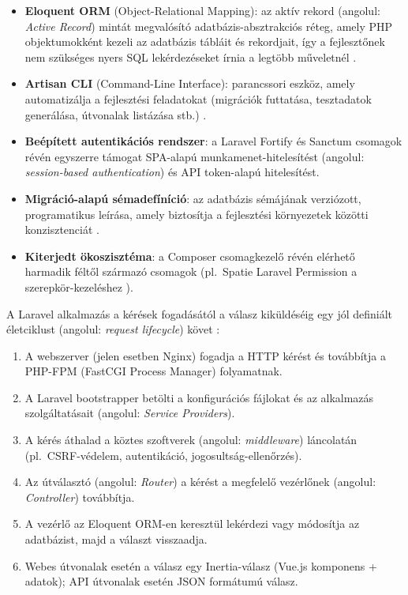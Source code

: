 \documentclass[colorlinks]{thesis-kando}
\begin{document}
\begin{itemize}
\item \textbf{Eloquent ORM} (Object-Relational Mapping): az aktív rekord (angolul: \emph{Active Record}) mintát megvalósító adatbázis-absztrakciós réteg, amely PHP objektumokként kezeli az adatbázis tábláit és rekordjait, így a fejlesztőnek nem szükséges nyers SQL lekérdezéseket írnia a legtöbb műveletnél \cite{ref14}.
\item \textbf{Artisan CLI} (Command-Line Interface): parancssori eszköz, amely automatizálja a fejlesztési feladatokat (migrációk futtatása, tesztadatok generálása, útvonalak listázása stb.) \cite{ref13}.
\item \textbf{Beépített autentikációs rendszer}: a Laravel Fortify és Sanctum csomagok révén egyszerre támogat SPA-alapú munkamenet-hitelesítést (angolul: \emph{session-based authentication}) és API token-alapú hitelesítést.
\item \textbf{Migráció-alapú sémadefíníció}: az adatbázis sémájának verziózott, programatikus leírása, amely biztosítja a fejlesztési környezetek közötti konzisztenciát \cite{ref13}.
\item \textbf{Kiterjedt ökoszisztéma}: a Composer csomagkezelő révén elérhető harmadik féltől származó csomagok (pl.\ Spatie Laravel Permission a szerepkör-kezeléshez \cite{ref15}).
\end{itemize}

A Laravel alkalmazás a kérések fogadásától a válasz kiküldéséig egy jól definiált életciklust (angolul: \emph{request lifecycle}) követ \cite{ref13}:

\begin{enumerate}
\item A webszerver (jelen esetben Nginx) fogadja a HTTP kérést és továbbítja a PHP-FPM (FastCGI Process Manager) folyamatnak.
\item A Laravel bootstrapper betölti a konfigurációs fájlokat és az alkalmazás szolgáltatásait (angolul: \emph{Service Providers}).
\item A kérés áthalad a köztes szoftverek (angolul: \emph{middleware}) láncolatán (pl.\ CSRF-védelem, autentikáció, jogosultság-ellenőrzés).
\item Az útválasztó (angolul: \emph{Router}) a kérést a megfelelő vezérlőnek (angolul: \emph{Controller}) továbbítja.
\item A vezérlő az Eloquent ORM-en keresztül lekérdezi vagy módosítja az adatbázist, majd a választ visszaadja.
\item Webes útvonalak esetén a válasz egy Inertia-válasz (Vue.js komponens + adatok); API útvonalak esetén JSON formátumú válasz.
\end{enumerate}
\end{document}
